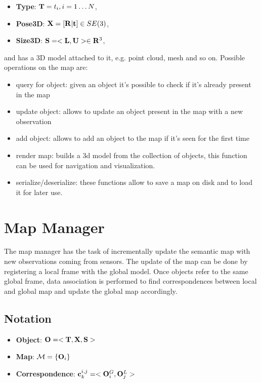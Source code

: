 \documentclass{article}
\begin{document}
	\begin{itemize}
		\item {\bf Type}: $\mathbf{T} = t_i , i=1 \dots N$,
		\item {\bf Pose3D}: $\mathbf{X} = [ \mathbf{R} | \mathbf{t}] \in SE(3)$,
		\item {\bf Size3D}: $\mathbf{S} = <\mathbf{L} ,\mathbf{U}> \in \mathbf{R}^3 $,
	\end{itemize}
	
	\noindent
	and has a 3D model attached to it, e.g. point cloud, mesh and so on. Possible operations on the map are:
	
	\begin{itemize}
		\item query for object: given an object it's possible to check if it's already present in the map
		\item update object: allows to update an object present in the map with a new observation
		\item add object: allows to add an object to the map if it's seen for the first time
		\item render map: builds a 3d model from the collection of objects, this function can be used for navigation and visualization.
		\item serialize/deserialize: these functions allow to save a map on disk and to load it for later use.
	\end{itemize}
	
	\section{Map Manager}
	
	The map manager has the task of incrementally update the semantic map with new observations coming from sensors. The update of the map can be done by registering a local frame with the global model. Once objects refer to the same global frame, data association is performed to find correspondences between local and global map and update the global map accordingly.
	
	\subsection{Notation}
	
	\begin{itemize}
		\item {\bf Object}: $ \mathbf{O} = < \mathbf{T}, \mathbf{X}, \mathbf{S} > $
		\item {\bf Map}: $\mathcal{M} = \{\mathbf{O}_i\}$  
		\item {\bf Correspondence}: $ \mathbf{c}^{i,j}_k = <\mathbf{O}_i^G,\mathbf{O}_j^L> $
	\end{itemize}
	
\end{document}

